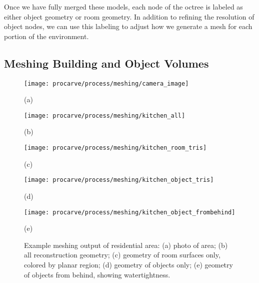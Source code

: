 \documentclass[12pt,onecolumn,oneside]{book}
\begin{document}

Once we have fully merged these models, each node of the octree is labeled as either object geometry or room geometry.  In addition to refining the resolution of object nodes, we can use this labeling to adjust how we generate a mesh for each portion of the environment.  

\subsection{Meshing Building and Object Volumes}
\label{ssec:procarve_meshing}

\begin{figure}[t]

	\begin{minipage}[t]{0.3\linewidth}
		\centerline{\texttt{[image: procarve/process/meshing/camera\_image]}}
		\centerline{(a)}
	\end{minipage}
	\hfill
	\begin{minipage}[t]{0.3\linewidth}
		\centerline{\texttt{[image: procarve/process/meshing/kitchen\_all]}}
		\centerline{(b)}
	\end{minipage}
	\hfill
	\begin{minipage}[t]{0.3\linewidth}
		\centerline{\texttt{[image: procarve/process/meshing/kitchen\_room\_tris]}}
		\centerline{(c)}
	\end{minipage}
	
	\centering
	\hfill
	\begin{minipage}[t]{0.3\linewidth}
		\centerline{\texttt{[image: procarve/process/meshing/kitchen\_object\_tris]}}
		\centerline{(d)}
	\end{minipage}
	\hfill
	\begin{minipage}[t]{0.3\linewidth}
		\centerline{\texttt{[image: procarve/process/meshing/kitchen\_object\_frombehind]}}
		\centerline{(e)}
	\end{minipage}
	\hfill	

	\caption[Example meshing output of residential area.]{Example meshing output of residential area: (a) photo of area; (b) all reconstruction geometry; (c) geometry of room surfaces only, colored by planar region; (d) geometry of objects only; (e) geometry of objects from behind, showing watertightness.}
	\label{fig:procarve_kitchen}
\end{figure}
\end{document}
